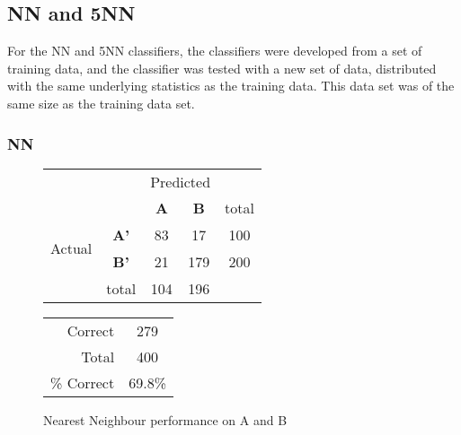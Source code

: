 \clearpage

\subsection{NN and 5NN}

For the NN and 5NN classifiers, the classifiers were developed from a set of training data, and the classifier was tested with a new set of data, distributed with the same underlying statistics as the training data. This data set was of the same size as the training data set.

\subsubsection{NN}
\begin{figure}[!ht]
\begin{minipage}[b]{0.5\linewidth}
\centering
	\begin{tabular}{ccc|c|c}
	 & &\multicolumn{2}{c}{Predicted} &\\
	  & & \bf{A} &  \bf{B} & total \\
	 \cline{3-5}
	 \multirow{2}{*}{\begin{sideways}Actual\end{sideways}} & \bf{A'}& 83 & 17 & 100 \\
	 \cline{3-5}
	 & \bf{B'}& 21 & 179 & 200 \\
	  \cline{3-5}
	 &total&104&196&\\
	\end{tabular}
\end{minipage}
\hspace{0.5cm}
\begin{minipage}[b]{0.5\linewidth}
	\begin{tabular}{r|c}
	\hline
	Correct& 279\\
	Total& 400\\
	\hline
	\% Correct& 69.8\%\\
	\hline
	\end{tabular}
\end{minipage}
\vspace{1mm}
\caption{Nearest Neighbour performance on A and B}
\end{figure}


